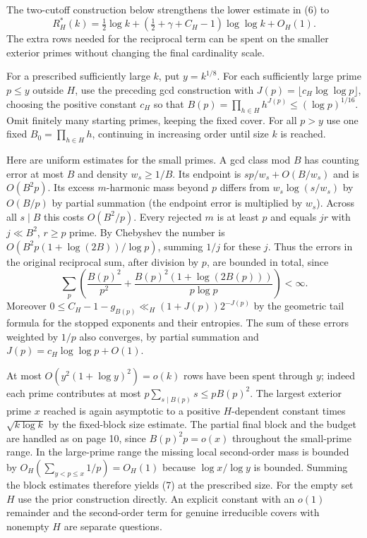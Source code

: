 \newpage
{}
The two-cutoff construction below strengthens the lower estimate in (6) to
\[
 R_H^*(k)=\tfrac12\log k+
       (\tfrac12+\gamma+C_H-1)\log\log k+O_H(1).\tag{7}
\]
The extra rows needed for the reciprocal term can be spent on the smaller exterior primes without changing the final cardinality scale.

For a prescribed sufficiently large $k$, put $y=k^{1/8}$. For each sufficiently large prime $p\le y$ outside $H$, use the preceding gcd construction with $J(p)=\lfloor c_H\log\log p\rfloor$, choosing the positive constant $c_H$ so that $B(p)=\prod_{h\in H}h^{J(p)}\le(\log p)^{1/16}$. Omit finitely many starting primes, keeping the fixed cover. For all $p>y$ use one fixed $B_0=\prod_{h\in H}h$, continuing in increasing order until size $k$ is reached.

Here are uniform estimates for the small primes. A gcd class mod $B$ has counting error at most $B$ and density $w_s\ge1/B$. Its endpoint is $sp/w_s+O(B/w_s)$ and is $O(B^2p)$. Its excess $m$-harmonic mass beyond $p$ differs from $w_s\log(s/w_s)$ by $O(B/p)$ by partial summation (the endpoint error is multiplied by $w_s$). Across all $s\mid B$ this costs $O(B^2/p)$. Every rejected $m$ is at least $p$ and equals $jr$ with $j\ll B^2$, $r\ge p$ prime. By Chebyshev the number is $O(B^2p(1+\log(2B))/\log p)$, summing $1/j$ for these $j$. Thus the errors in the original reciprocal sum, after division by $p$, are bounded in total, since
\[
 \sum_p\left(\frac{B(p)^2}{p^2}+
       \frac{B(p)^2(1+\log(2B(p)))}{p\log p}\right)<\infty .
\]
Moreover $0\le C_H-1-g_{B(p)}\ll_H(1+J(p))2^{-J(p)}$ by the geometric tail formula for the stopped exponents and their entropies. The sum of these errors weighted by $1/p$ also converges, by partial summation and $J(p)=c_H\log\log p+O(1)$.

At most $O(y^2(1+\log y)^2)=o(k)$ rows have been spent through $y$; indeed each prime contributes at most $p\sum_{s\mid B(p)}s\le p B(p)^2$. The largest exterior prime $x$ reached is again asymptotic to a positive $H$-dependent constant times $\sqrt{k\log k}$ by the fixed-block size estimate. The partial final block and the budget are handled as on page 10, since $B(p)^2 p=o(x)$ throughout the small-prime range. In the large-prime range the missing local second-order mass is bounded by $O_H(\sum_{y<p\le x}1/p)=O_H(1)$ because $\log x/\log y$ is bounded. Summing the block estimates therefore yields (7) at the prescribed size. For the empty set $H$ use the prior construction directly. An explicit constant with an $o(1)$ remainder and the second-order term for genuine irreducible covers with nonempty $H$ are separate questions.

